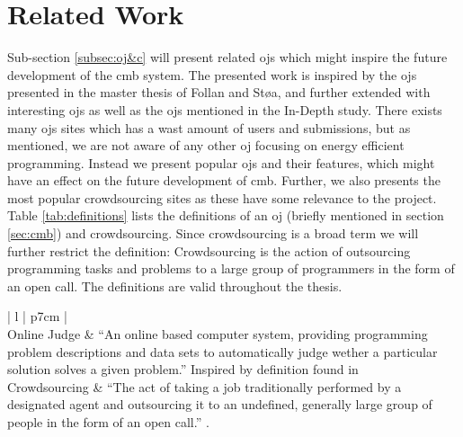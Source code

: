 \section{Related Work}
\label{sec:related}
Sub-section \ref{subsec:oj&c} will present related \gls{ojs} which might inspire the future development of the \gls{cmb} system. The presented work is inspired by the \gls{ojs} presented in the master thesis of Follan and Støa, and further extended with interesting \gls{ojs} as well as the \gls{ojs} mentioned in the In-Depth study. There exists many \gls{ojs} sites which has a wast amount of users and submissions, but as mentioned, we are not aware of any other \gls{oj} focusing on energy efficient programming. Instead we present popular \gls{ojs} and their features, which might have an effect on the future development of \gls{cmb}. Further, we also presents the most popular crowdsourcing sites as these have some relevance to the project. Table \ref{tab:definitions} lists the definitions of an \gls{oj} (briefly mentioned in section \ref{sec:cmb}) and crowdsourcing. Since crowdsourcing is a broad term we will further restrict the definition: Crowdsourcing is the action of outsourcing programming tasks and problems to a large group of programmers in the form of an open call. The definitions are valid throughout the thesis.\\


\begin{table}[t!]
    \centering
    \begin{tabular}{ | l | p{7cm} | }
    \hline
     \\
    \hline
    Online Judge & ``An online based computer system, providing programming problem descriptions and data sets to automatically judge wether a particular solution solves a given problem.'' Inspired by definition found in \cite{a:Kurnia2001}  \\ \hline
    Crowdsourcing & ``The act of taking a job traditionally performed by a designated agent and outsourcing it to an undefined, generally large group of people in the form of an open call.'' \cite{CROWDSOURCING}. \\ \hline
    \end{tabular}
    \caption{Defining \gls{ojs} and Crowdsourcing}
    \label{tab:definitions}
\end{table}

